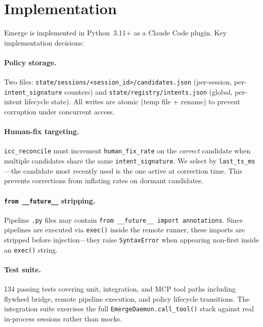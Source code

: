 \documentclass[11pt,a4paper]{article}
\begin{document}
\section{Implementation}

Emerge is implemented in Python~3.11+ as a Claude Code plugin.
Key implementation decisions:

\paragraph{Policy storage.}
Two files: \texttt{state/sessions/<session\_id>/candidates.json} (per-session,
per-\texttt{intent\_signature} counters) and
\texttt{state/registry/intents.json} (global, per-intent lifecycle state).
All writes are atomic (temp file + rename) to prevent corruption under concurrent access.

\paragraph{Human-fix targeting.}
\texttt{icc\_reconcile} must increment \texttt{human\_fix\_rate} on the \emph{correct} candidate
when multiple candidates share the same \texttt{intent\_signature}.
We select by \texttt{last\_ts\_ms}---the candidate most recently used is the one active at correction time.
This prevents corrections from inflating rates on dormant candidates.

\paragraph{\texttt{from \_\_future\_\_} stripping.}
Pipeline \texttt{.py} files may contain \texttt{from \_\_future\_\_ import annotations}.
Since pipelines are executed via \texttt{exec()} inside the remote runner,
these imports are stripped before injection---they raise \texttt{SyntaxError} when appearing
non-first inside an \texttt{exec()} string.

\paragraph{Test suite.}
134 passing tests covering unit, integration, and MCP tool paths including flywheel bridge,
remote pipeline execution, and policy lifecycle transitions.
The integration suite exercises the full \texttt{EmergeDaemon.call\_tool()} stack against real
in-process sessions rather than mocks.
\end{document}
